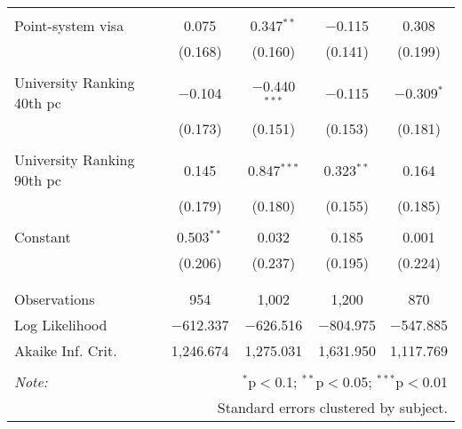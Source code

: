 \begin{table}[!htbp]
\begin{tabular}{@{\extracolsep{5pt}}lcccc}
  & & & & \\ 
 Point-system visa & 0.075 & 0.347$^{**}$ & $-$0.115 & 0.308 \\ 
  & (0.168) & (0.160) & (0.141) & (0.199) \\ 
  & & & & \\ 
 University Ranking 40th pc & $-$0.104 & $-$0.440$^{***}$ & $-$0.115 & $-$0.309$^{*}$ \\ 
  & (0.173) & (0.151) & (0.153) & (0.181) \\ 
  & & & & \\ 
 University Ranking 90th pc & 0.145 & 0.847$^{***}$ & 0.323$^{**}$ & 0.164 \\ 
  & (0.179) & (0.180) & (0.155) & (0.185) \\ 
  & & & & \\ 
 Constant & 0.503$^{**}$ & 0.032 & 0.185 & 0.001 \\ 
  & (0.206) & (0.237) & (0.195) & (0.224) \\ 
  & & & & \\ 
\hline \\[-1.8ex] 
Observations & 954 & 1,002 & 1,200 & 870 \\ 
Log Likelihood & $-$612.337 & $-$626.516 & $-$804.975 & $-$547.885 \\ 
Akaike Inf. Crit. & 1,246.674 & 1,275.031 & 1,631.950 & 1,117.769 \\ 
\hline 
\hline \\[-1.8ex] 
\textit{Note:}  & \multicolumn{4}{r}{$^{*}$p$<$0.1; $^{**}$p$<$0.05; $^{***}$p$<$0.01} \\ 
 & \multicolumn{4}{r}{Standard errors clustered by subject.} \\ 
\end{tabular} 
\end{table} 
